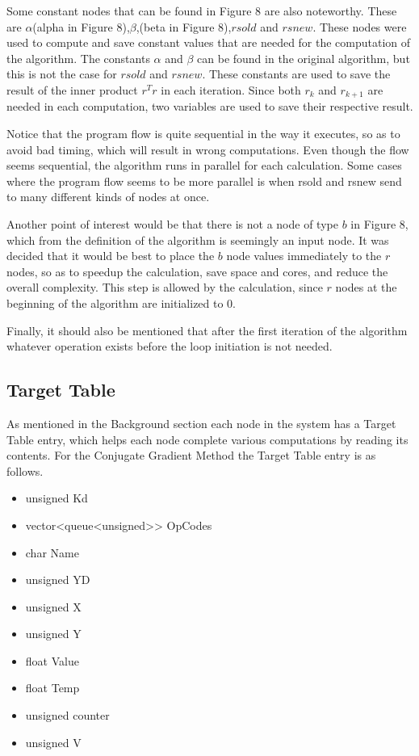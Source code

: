 \documentclass[12pt,twosided]{article}
\begin{document}
Some constant nodes that can be found in Figure 8 are also noteworthy. These are $\alpha$(alpha in Figure 8),$\beta$,(beta in Figure 8),$rsold$ and $rsnew$. These nodes were used to compute and save constant values that are needed for the computation of the algorithm. The constants $\alpha$ and $\beta$ can be found in the original algorithm, but this is not the case for $rsold$ and $rsnew$. These constants are used to save the result of the inner product $r^Tr$ in each iteration. Since both $r_k$ and $r_{k+1}$ are needed in each computation, two variables are used to save their respective result.

Notice that the program flow is quite sequential in the way it executes, so as to avoid bad timing, which will result in wrong computations. Even though the flow seems sequential, the algorithm runs in parallel for each calculation. Some cases where the program flow seems to be more parallel is when rsold and rsnew send to many different kinds of nodes at once.

Another point of interest would be that there is not a node of type $b$ in Figure 8, which from the definition of the algorithm is seemingly an input node. It was decided that it would be best to place the $b$ node values immediately to the $r$ nodes, so as to speedup the calculation, save space and cores, and reduce the overall complexity. This step is allowed by the calculation, since $r$ nodes at the beginning of the algorithm are initialized to 0.

Finally, it should also be mentioned that after the first iteration of the algorithm whatever operation exists before the loop initiation is not needed.
\subsection{Target Table}
As mentioned in the Background section each node in the system has a Target Table entry, which helps each node complete various computations by reading its contents. For the Conjugate Gradient Method the Target Table entry is as follows.
\begin{itemize}
\item unsigned Kd
\item vector<queue<unsigned>> OpCodes
\item char Name
\item unsigned YD
\item unsigned X
\item unsigned Y
\item float Value
\item float Temp
\item unsigned counter
\item unsigned V
\end{itemize}
\end{document}
